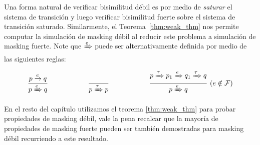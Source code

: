 Una forma natural de verificar bisimilitud débil es por medio de \emph{saturar}
el sistema de transición  \cite{FernandezM91,Milner89} y luego verificar bisimilitud fuerte sobre el sistema de transición saturado.
Similarmente, el Teorema~\ref{thm:weak_thm} nos permite computar la simulación de masking débil al reducir este problema a simulación de masking fuerte. Note que $\xRightarrow{e}$ puede ser alternativamente definida por medio de las siguientes reglas:

\[
\dfrac{p \xrightarrow{e} q}{p\xRightarrow{e} q} \hspace{2cm} 
\dfrac{}{p\xRightarrow{\tau} p} \hspace{2cm} 
\dfrac{p\xRightarrow{\tau} p_1 \xRightarrow{e} q_1 \xRightarrow{\tau} q}{p\xRightarrow{e} q}~(e \notin \mathcal{F})
\]
	
 En el resto del capítulo utilizamos el teorema \ref{thm:weak_thm} para probar propiedades de masking débil, vale la pena recalcar que la mayoría de propiedades de masking fuerte pueden ser también demostradas para masking débil recurriendo a este resultado.

